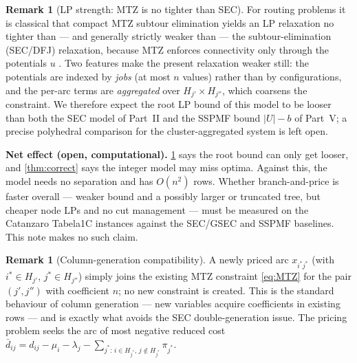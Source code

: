 \documentclass[11pt,a4paper]{article}
\theoremstyle{plain}
\theoremstyle{definition}
\newtheorem{remark}[theorem]{Remark}
\begin{document}
\begin{remark}[LP strength: MTZ is no tighter than SEC]
	\label{rem:lpweak}
	For routing problems it is classical that compact MTZ subtour elimination yields an LP
	relaxation no tighter than --- and generally strictly weaker than --- the
	subtour-elimination (SEC/DFJ) relaxation, because MTZ enforces connectivity only through
	the potentials $u$ \cite{Applegate2006,DesrochersLaporte1991}. Two features make the
	present relaxation weaker still: the potentials are indexed by \emph{jobs} (at most $n$
	values) rather than by configurations, and the per-arc terms are \emph{aggregated} over
	$H_{j'}\times H_{j''}$, which coarsens the constraint. We therefore expect the root LP bound
	of this model to be looser than both the SEC model of Part~II and the SSPMF bound $|U|-b$ of
	Part~V; a precise polyhedral comparison for the cluster-aggregated system is left open.
\end{remark}

\begin{openproblem}
	\textbf{Net effect (open, computational).} \cref{rem:lpweak} says the root bound can only
	get looser, and \cref{thm:correct} says the integer model may miss optima. Against this, the
	model needs no separation and has $O(n^2)$ rows. Whether branch-and-price is faster overall
	--- weaker bound and a possibly larger or truncated tree, but cheaper node LPs and no cut
	management --- must be measured on the Catanzaro Tabela1C instances against the SEC/GSEC and
	SSPMF baselines. This note makes no such claim.
\end{openproblem}

\begin{remark}[Column-generation compatibility]
	\label{rem:cg}
	A newly priced arc $x_{i^{*}j^{*}}$ (with $i^{*}\in H_{j'}$, $j^{*}\in H_{j''}$) simply
	joins the existing MTZ constraint \eqref{eq:MTZ} for the pair $(j',j'')$ with coefficient
	$n$; no new constraint is created. This is the standard behaviour of column generation ---
	new variables acquire coefficients in existing rows \cite{Lubbecke2005} --- and is exactly
	what avoids the SEC double-generation issue. The pricing problem seeks the arc of most
	negative reduced cost
	$\bar d_{ij}=d_{ij}-\mu_i-\lambda_j-\sum_{j^{*}:\,i\in H_{j^{*}},\,j\notin H_{j^{*}}}\pi_{j^{*}}$.
\end{remark}
\end{document}

